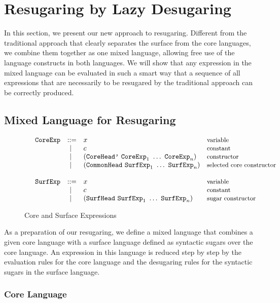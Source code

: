 
\section{Resugaring by Lazy Desugaring}
\label{sec3}

In this section, we present our new approach to resugaring. Different from the traditional approach that clearly separates the surface from the core languages, we combine them together as one mixed language, allowing free use of the language constructs in both languages. We will show that any expression in the mixed language can be evaluated in such a smart way that a sequence of all expressions that are necessarily to be resugared by the traditional approach can be correctly produced.

\subsection{Mixed Language for Resugaring}

\begin{figure}[t]
	\[
	\begin{array}{lllll}
	 &\mbox{\tt CoreExp} &::=& x  & \mbox{{\small variable}}\\
	       &&~|~& c  & \mbox{{\small constant}}\\
				 &&~|~& (\mbox{\tt CoreHead'}~\mbox{\tt CoreExp}_1~\ldots~\mbox{\tt CoreExp}_n) & \mbox{{\small constructor}}\\
				 &&~|~& (\mbox{\tt CommonHead}~\mbox{\tt SurfExp}_1~\ldots~\mbox{\tt SurfExp}_n) & \mbox{{\small selected core constructor}}\\
	\\
	 &\mbox{\tt SurfExp} &::=& x  & \mbox{{\small variable}}\\
	       &&~|~& c  & \mbox{{\small constant}}\\
				 &&~|~& (\mbox{\tt SurfHead}~\mbox{\tt SurfExp}_1~\ldots~\mbox{\tt SurfExp}_n) & \mbox{{\small sugar constructor}}
	\end{array}
	\]
	\caption{Core and Surface Expressions}
	\label{fig:expression}
\end{figure}

As a preparation of our resugaring, we define a mixed language that combines a given core language with a surface language defined as syntactic sugars over the core language. An expression in this language is reduced step by step by the evaluation rules for the core language and the desugaring rules for the syntactic sugars in the surface language.

\subsubsection{Core Language}

